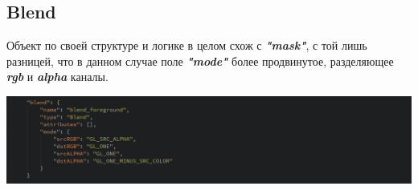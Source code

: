 \documentclass[11pt]{report}
\begin{document}
\newpage
\subsection{Blend}
Объект по своей структуре и логике в целом схож с \textit{\textbf{"mask"}}, с той лишь разницей, что в данном случае поле \textit{\textbf{"mode"}} более продвинутое, разделяющее \textit{\textbf{rgb}} и \textit{\textbf{alpha}} каналы.
\begin{center}
	\includegraphics[width=1.2\linewidth]{img/26.png} 
  	\label{img:260} 
\end{center}
 
\end{document}
